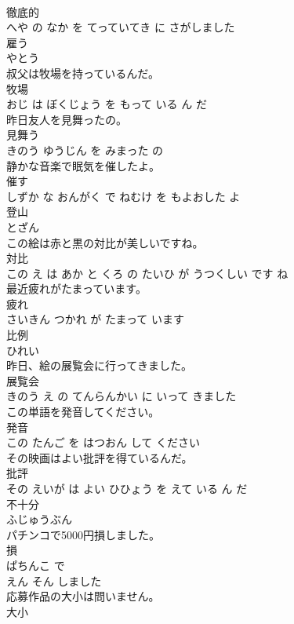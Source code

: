 \documentclass[8pt]{extreport}
\begin{document}
\begin{CJK}{UTF8}{min}
\\	徹底的 
\\	へや の なか を てっていてき に さがしました			
\\	雇う	
\\	やとう			
\\	叔父は牧場を持っているんだ。	
\\	牧場 
\\	おじ は ぼくじょう を もって いる ん だ			
\\	昨日友人を見舞ったの。	
\\	見舞う 
\\	きのう ゆうじん を みまった の			
\\	静かな音楽で眠気を催したよ。	
\\	催す 
\\	しずか な おんがく で ねむけ を もよおした よ			
\\	登山	
\\	とざん			
\\	この絵は赤と黒の対比が美しいですね。	
\\	対比 
\\	この え は あか と くろ の たいひ が うつくしい です ね			
\\	最近疲れがたまっています。	
\\	疲れ 
\\	さいきん つかれ が たまって います			
\\	比例	
\\	ひれい			
\\	昨日、絵の展覧会に行ってきました。	
\\	展覧会 
\\	きのう え の てんらんかい に いって きました			
\\	この単語を発音してください。	
\\	発音 
\\	この たんご を はつおん して ください			
\\	その映画はよい批評を得ているんだ。	
\\	批評 
\\	その えいが は よい ひひょう を えて いる ん だ			
\\	不十分	
\\	ふじゅうぶん			
\\	パチンコで5000円損しました。	
\\	損 
\\	ぱちんこ で 
\\	えん そん しました			
\\	応募作品の大小は問いません。	
\\	大小 

\end{CJK}
\end{document}
